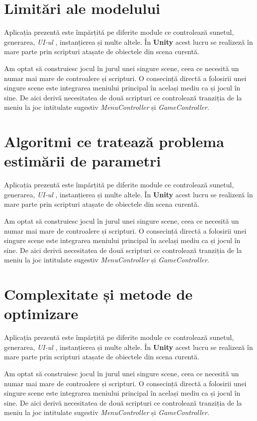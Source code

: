 \section{Limitări ale modelului}
Aplicația prezentă este împărțită pe diferite module ce controlează sunetul, generarea, \textit{UI-ul} , instanțierea și multe altele. În \textbf{Unity} acest lucru se realizeză în mare parte prin scripturi atașate de obiectele din scena curentă. \par
Am optat să construiesc jocul în jurul unei singure scene, ceea ce necesită un numar mai mare de controalere și scripturi. O consecință directă a folosirii unei singure scene este integrarea meniului principal în același mediu ca și jocul în sine. De aici derivă necesitatea de două scripturi ce controlează tranziția de la meniu la joc intitulate sugestiv \textit{MenuController} și \textit{GameController}.\par

\section{Algoritmi ce tratează problema estimării de parametri}
Aplicația prezentă este împărțită pe diferite module ce controlează sunetul, generarea, \textit{UI-ul} , instanțierea și multe altele. În \textbf{Unity} acest lucru se realizeză în mare parte prin scripturi atașate de obiectele din scena curentă. \par
Am optat să construiesc jocul în jurul unei singure scene, ceea ce necesită un numar mai mare de controalere și scripturi. O consecință directă a folosirii unei singure scene este integrarea meniului principal în același mediu ca și jocul în sine. De aici derivă necesitatea de două scripturi ce controlează tranziția de la meniu la joc intitulate sugestiv \textit{MenuController} și \textit{GameController}.\par

\section{Complexitate și metode de optimizare}
Aplicația prezentă este împărțită pe diferite module ce controlează sunetul, generarea, \textit{UI-ul} , instanțierea și multe altele. În \textbf{Unity} acest lucru se realizeză în mare parte prin scripturi atașate de obiectele din scena curentă. \par
Am optat să construiesc jocul în jurul unei singure scene, ceea ce necesită un numar mai mare de controalere și scripturi. O consecință directă a folosirii unei singure scene este integrarea meniului principal în același mediu ca și jocul în sine. De aici derivă necesitatea de două scripturi ce controlează tranziția de la meniu la joc intitulate sugestiv \textit{MenuController} și \textit{GameController}.\par

